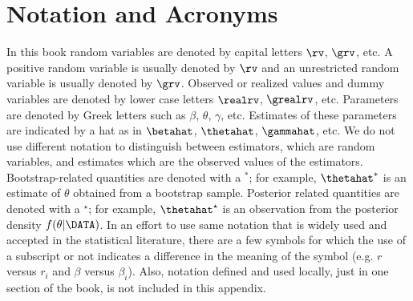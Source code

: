 
\chapter{Notation and Acronyms}
In this book random variables are denoted by capital letters $\rv$,
$\grv$, etc. A positive random variable is usually denoted by $\rv$
and an unrestricted random variable is usually denoted by
$\grv$. Observed or realized values and dummy variables are denoted
by lower case letters $\realrv$, $\grealrv$, etc. Parameters are
denoted by Greek letters such as $\beta$, $\theta$, $\gamma$,
etc. Estimates of these parameters are indicated by a hat as in
$\betahat$, $\thetahat$, $\gammahat$, etc.  We do not use different
notation to distinguish between estimators, which are random
variables, and estimates which are the observed values of the
estimators.  Bootstrap-related quantities are denoted with a
$\mbox{}^{*}$; for example, $\thetahat^{*}$ is an estimate of
$\theta$ obtained from a bootstrap sample.  Posterior related
quantities are denoted with a $\mbox{}^{\star}$; for example,
$\thetahat^{\star}$ is an observation from the posterior density
$f(\theta|\DATA)$.  In an effort to use same notation that is widely
used and accepted in the statistical literature, there are a few
symbols for which the use of a subscript or not indicates a
difference in the meaning of the symbol (e.g. $r$ versus $r_{i}$ and
$\beta$ versus $\beta_{i}$). Also, notation defined and used
locally, just in one section of the book, is not included in this
appendix.

